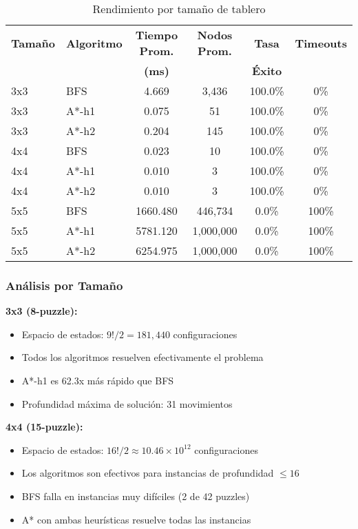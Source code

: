 \documentclass[12pt,a4paper]{article}
\begin{document}
\begin{table}[H]
\centering
\caption{Rendimiento por tamaño de tablero}
\label{tab:scalability}
\begin{tabular}{@{}llcccc@{}}
\toprule
\textbf{Tamaño} & \textbf{Algoritmo} & \textbf{Tiempo Prom.} & \textbf{Nodos Prom.} & \textbf{Tasa} & \textbf{Timeouts} \\
 & & \textbf{(ms)} & & \textbf{Éxito} & \\
\midrule
3x3 & BFS & 4.669 & 3,436 & 100.0\% & 0\% \\
3x3 & A*-h1 & 0.075 & 51 & 100.0\% & 0\% \\
3x3 & A*-h2 & 0.204 & 145 & 100.0\% & 0\% \\
\midrule
4x4 & BFS & 0.023 & 10 & 100.0\% & 0\% \\
4x4 & A*-h1 & 0.010 & 3 & 100.0\% & 0\% \\
4x4 & A*-h2 & 0.010 & 3 & 100.0\% & 0\% \\
\midrule
5x5 & BFS & 1660.480 & 446,734 & 0.0\% & 100\% \\
5x5 & A*-h1 & 5781.120 & 1,000,000 & 0.0\% & 100\% \\
5x5 & A*-h2 & 6254.975 & 1,000,000 & 0.0\% & 100\% \\
\bottomrule
\end{tabular}
\end{table}

\subsubsection{Análisis por Tamaño}

\textbf{3x3 (8-puzzle):}
\begin{itemize}
    \item Espacio de estados: $9!/2 = 181,440$ configuraciones
    \item Todos los algoritmos resuelven efectivamente el problema
    \item A*-h1 es 62.3x más rápido que BFS
    \item Profundidad máxima de solución: 31 movimientos
\end{itemize}

\textbf{4x4 (15-puzzle):}
\begin{itemize}
    \item Espacio de estados: $16!/2 \approx 10.46 \times 10^{12}$ configuraciones
    \item Los algoritmos son efectivos para instancias de profundidad $\leq 16$
    \item BFS falla en instancias muy difíciles (2 de 42 puzzles)
    \item A* con ambas heurísticas resuelve todas las instancias
\end{itemize}
\end{document}
